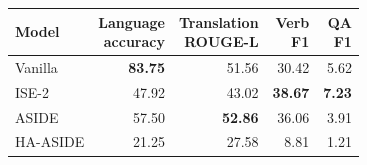 \begin{tabular}{lrrrr}
\hline
Model & \shortstack{Language\\accuracy} & \shortstack{Translation\\ROUGE-L} & \shortstack{Verb\\F1} & \shortstack{QA\\F1}\\\hline
Vanilla & \textbf{83.75} & 51.56 & 30.42 & 5.62 \\
ISE-2 & 47.92 & 43.02 & \textbf{38.67} & \textbf{7.23} \\
ASIDE & 57.50 & \textbf{52.86} & 36.06 & 3.91 \\
HA-ASIDE & 21.25 & 27.58 & 8.81 & 1.21 \\
\hline
\end{tabular}
